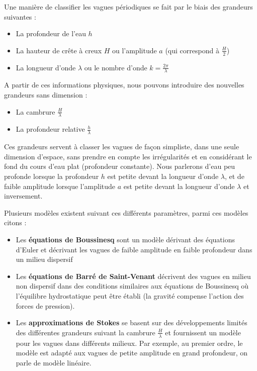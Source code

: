 \vspace{1em}

Une manière de classifier les vagues périodiques se fait par le biais des grandeurs suivantes :
\begin{itemize}
    \item La profondeur de l'eau $h$
    \item La hauteur de crête à creux $H$ ou l'amplitude $a$ \big(qui correspond à $\frac{H}{2}$\big)
    \item La longueur d'onde $\lambda$ ou le nombre d'onde $k = \frac{2\pi}{\lambda}$
\end{itemize}

\vspace{1em}

A partir de ces informations physiques, nous pouvons introduire des nouvelles grandeurs sans dimension :
\begin{itemize}
    \item La cambrure $\frac{H}{\lambda}$
    \item La profondeur relative $\frac{h}{\lambda}$
\end{itemize}
\vspace{1em}

Ces grandeurs servent à classer les vagues de façon simpliste, dans une seule dimension d'espace, sans prendre en compte les irrégularités et en considérant le fond du cours d'eau plat (profondeur constante). Nous parlerons d'eau peu profonde lorsque la profondeur $h$ est petite devant la longueur d'onde $\lambda$, et de faible amplitude lorsque l'amplitude $a$ est petite devant la longueur d'onde $\lambda$ et inversement.

Plusieurs modèles existent suivant ces différents paramètres, parmi ces modèles citons :

\begin{itemize}
    \item Les \textbf{équations de Boussinesq} sont un modèle dérivant des équations d'Euler et décrivant les vagues de faible amplitude en faible profondeur dans un milieu dispersif 
    \item Les \textbf{équations de Barré de Saint-Venant} décrivent des vagues en milieu non dispersif dans des conditions similaires aux équations de Boussinesq où l'équilibre hydrostatique peut être établi (la gravité compense l'action des forces de pression).
    \item Les \textbf{approximations de Stokes} se basent sur des développements limités des différentes grandeurs suivant la cambrure $\frac{H}{\lambda}$ et fournissent un modèle pour les vagues dans différents milieux. Par exemple, au premier ordre, le modèle est adapté aux vagues de petite amplitude en grand profondeur, on parle de modèle linéaire.
\end{itemize}

